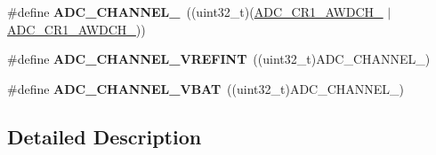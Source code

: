 \begin{DoxyCompactItemize}
\item 
\#define {\bfseries A\+D\+C\+\_\+\+C\+H\+A\+N\+N\+E\+L\+\_}~((uint32\+\_\+t)(\hyperlink{group___peripheral___registers___bits___definition_gaf37f3c0d7c72192803d0772e076cf8ee}{A\+D\+C\+\_\+\+C\+R1\+\_\+\+A\+W\+D\+C\+H\+\_} $\vert$ \hyperlink{group___peripheral___registers___bits___definition_gafcd37244d74db7c9a34a4f08b94301ae}{A\+D\+C\+\_\+\+C\+R1\+\_\+\+A\+W\+D\+C\+H\+\_}))\hypertarget{group___a_d_c__channels_ga30fc8e77b4c89d3ea0609cfbc7fc90fd}{}\label{group___a_d_c__channels_ga30fc8e77b4c89d3ea0609cfbc7fc90fd}

\item 
\#define {\bfseries A\+D\+C\+\_\+\+C\+H\+A\+N\+N\+E\+L\+\_\+\+V\+R\+E\+F\+I\+NT}~((uint32\+\_\+t)A\+D\+C\+\_\+\+C\+H\+A\+N\+N\+E\+L\+\_)\hypertarget{group___a_d_c__channels_ga2647a044275a295693e8fb01db3172f9}{}\label{group___a_d_c__channels_ga2647a044275a295693e8fb01db3172f9}

\item 
\#define {\bfseries A\+D\+C\+\_\+\+C\+H\+A\+N\+N\+E\+L\+\_\+\+V\+B\+AT}~((uint32\+\_\+t)A\+D\+C\+\_\+\+C\+H\+A\+N\+N\+E\+L\+\_)\hypertarget{group___a_d_c__channels_ga60210f1e9305301dea9e42afedd9093f}{}\label{group___a_d_c__channels_ga60210f1e9305301dea9e42afedd9093f}

\end{DoxyCompactItemize}


\subsection{Detailed Description}

